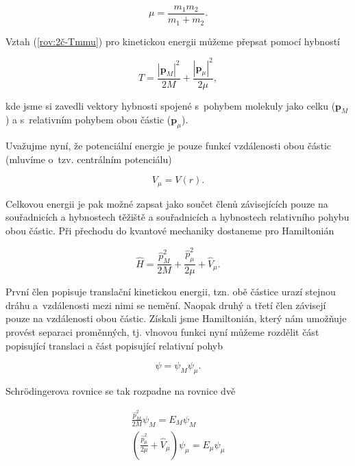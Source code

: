 \begin{equation}
\mu=\frac{m_{1}m_{2}}{m_{1}+m_{2}}.
\end{equation}

\noindent Vztah (\eqref{rov:2č-Tmmu}) pro kinetickou energii můžeme přepsat pomocí hybností

 \begin{equation}
T=\frac{|\textbf{p}_{M}|^{2}}{2M}+\frac{|\textbf{p}_{\mu}|^{2}}{2\mu},
\label{rov:2č-Thybnosti}
\end{equation}

kde jsme si zavedli vektory hybnosti spojené s~pohybem molekuly jako celku ($ \textbf{p}_{M} $) a s~relativním pohybem obou částic ($ \textbf{p}_{\mu} $). 

Uvažujme nyní, že potenciální energie je pouze funkcí vzdálenosti obou částic (mluvíme o~tzv. centrálním potenciálu)

\begin{equation}
V_{\mu}=V(r).
\end{equation}

Celkovou energii je pak možné zapsat jako součet členů závisejících pouze na souřadnicích a hybnostech těžiště a souřadnicích a hybnostech relativního pohybu obou částic. Při přechodu do kvantové mechaniky dostaneme pro Hamiltonián

\begin{equation}
\hat{H}=\frac{{\hat{p}}_{M}^{2}}{2M}+\frac{{\hat{p}}_{\mu}^{2}}{2\mu}+\hat{V}_{\mu}.
\end{equation}

První člen popisuje translační kinetickou energii, tzn. obě částice urazí stejnou dráhu a~vzdálenosti mezi nimi se nemění. Naopak druhý a třetí člen závisejí pouze na vzdálenosti obou částic. Získali jsme Hamiltonián, který nám umožňuje provést separaci proměnných, tj. vlnovou funkci nyní můžeme rozdělit část popisující translaci a část popisující relativní pohyb

\begin{equation}
\psi=\psi_{M}\psi_{\mu}.
\end{equation}

Schr\"odingerova rovnice se tak rozpadne na  rovnice dvě

\begin{eqnarray}
&\boxed{\frac{{\hat{p}}_{M}^{2}}{2M}\psi_{M} = E_{M}\psi_{M}}&
\label{rov:2č-schr-trans} \\
&\boxed{\left(\frac{{\hat{p}}_{\mu}^{2}}{2\mu}+\hat{V}_{\mu}\right)\psi_{\mu} = E_{\mu}\psi_{\mu}}&
\label{rov:2č-schr-vibr}
\end{eqnarray}

